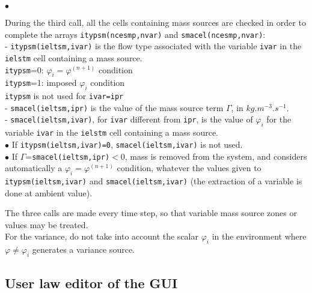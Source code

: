 {{{\begin{list}{$\bullet$}{}
\item During the third call, all the cells containing mass sources are
      checked in order to complete the arrays
      \mbox{\texttt{itypsm(ncesmp,nvar)}} and
      \mbox{\texttt{smacel(ncesmp,nvar)}}:\\
- \texttt{itypsm(ieltsm,ivar)} is the flow type associated with the variable
      \texttt{ivar} in the \texttt{ielstm}\raisebox{1ex}{\small th} cell
      containing a mass source.\\
\hspace*{1cm}\texttt{itypsm}=0: $\varphi_i=\varphi^{(n+1)}$ condition\\
\hspace*{1cm}\texttt{itypsm}=1: imposed $\varphi_i$ condition\\
\hspace*{1cm}\texttt{itypsm} is not used for \texttt{ivar=ipr}\\
- \texttt{smacel(ieltsm,ipr)} is the value of the mass source term $\Gamma$, in
$kg.m^{-3}.s^{-1}$.\\
- \texttt{smacel(ieltsm,ivar)}, for \texttt{ivar} different from
\texttt{ipr}, is the value
of $\varphi_i$ for the variable \texttt{ivar} in the
\texttt{ielstm}\raisebox{1ex}{\small th} cell containing a mass source.\\

$\bullet$ If \texttt{itypsm(ieltsm,ivar)=0}, \texttt{smacel(ieltsm,ivar)}
      is not used.\\
$\bullet$ If $\Gamma$=\texttt{smacel(ieltsm,ipr)}$<$0, mass is removed from
      the system, and \CS considers automatically a
      $\varphi_i=\varphi^{(n+1)}$ condition, whatever the values given
      to \texttt{itypsm(ieltsm,ivar)} and \texttt{smacel(ieltsm,ivar)}
      (the extraction of a variable is done at ambient value).
\end{list}

The three calls are made every time step, so that variable mass source
zones or values may be treated.\\

For the variance, do not take into account the scalar $\varphi_i$ in the environment
where $\varphi\ne\varphi_i$ generates a variance source.

\subsection{User law editor of the GUI}

}}}
